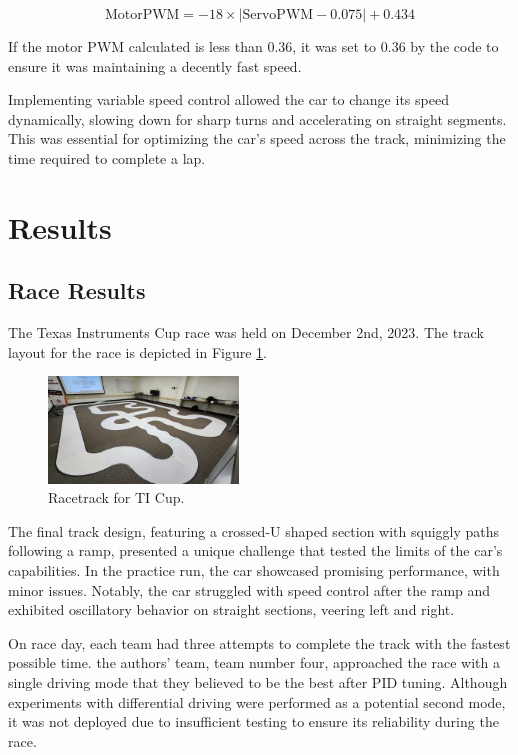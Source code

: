 \documentclass[conference]{IEEEtran}
\begin{document}
\begin{equation}
	\text{MotorPWM} = -18 \times |\text{ServoPWM} - 0.075| + 0.434 \label{eq:speed}
\end{equation}

If the motor PWM calculated is less than 0.36, it was set to 0.36 by the code to ensure it was maintaining a decently fast speed.

Implementing variable speed control allowed the car to change its speed dynamically, slowing down for sharp turns and accelerating on straight segments. This was essential for optimizing the car's speed across the track, minimizing the time required to complete a lap.

\section{Results}

\subsection{Race Results}

The Texas Instruments Cup race was held on December 2nd, 2023. The track layout for the race is depicted in Figure \ref{fig:track}.

\begin{figure}[htbp]
	\centerline{\includegraphics[width=0.45\textwidth]{images/track.jpg}}
	\caption{Racetrack for TI Cup.}
	\label{fig:track}
\end{figure}

The final track design, featuring a crossed-U shaped section with squiggly paths following a ramp, presented a unique challenge that tested the limits of the car's capabilities. In the practice run, the car showcased promising performance, with minor issues. Notably, the car struggled with speed control after the ramp and exhibited oscillatory behavior on straight sections, veering left and right.

On race day, each team had three attempts to complete the track with the fastest possible time. the authors' team, team number four, approached the race with a single driving mode that they believed to be the best after PID tuning. Although experiments with differential driving were performed as a potential second mode, it was not deployed due to insufficient testing to ensure its reliability during the race.
\end{document}
